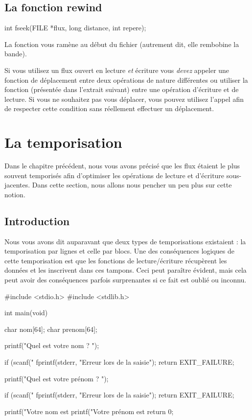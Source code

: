\subsection{La fonction rewind}
\label{la-fonction-rewind}

\begin{C}
int fseek(FILE *flux, long distance, int repere);
\end{C}

La fonction  vous ramène au début du fichier (autrement
dit, elle rembobine la bande).

\begin{erreurbox}
  Si vous utilisez un flux ouvert en lecture
\emph{et} écriture vous \emph{devez} appeler une fonction de déplacement
entre deux opérations de nature différentes ou utiliser la fonction
 (présentée dans l'extrait suivant) entre une opération
d'écriture et de lecture. Si vous ne souhaitez pas vous déplacer, vous
pouvez utilisez l'appel  afin de
respecter cette condition sans réellement effectuer un déplacement.
\end{erreurbox}

\section{La temporisation}
\label{la-temporisation}

Dans le chapitre précédent, nous vous avons précisé que les flux
étaient le plus souvent temporisés afin d'optimiser les opérations de
lecture et d'écriture sous-jacentes. Dans cette section, nous allons
nous pencher un peu plus sur cette notion.

\subsection{Introduction}
\label{introduction-4}

Nous vous avons dit auparavant que deux types de temporisations
existaient : la temporisation par lignes et celle par blocs. Une des
conséquences logiques de cette temporisation est que les fonctions de
lecture/écriture récupèrent les données et les inscrivent dans ces
tampons. Ceci peut paraître évident, mais cela peut avoir des
conséquences parfois surprenantes si ce fait est oublié ou inconnu.

\begin{C}
#include <stdio.h>
#include <stdlib.h>


int main(void)
{
    char nom[64];
    char prenom[64];

    printf("Quel est votre nom ? ");

    if (scanf("%
    {
        fprintf(stderr, "Erreur lors de la saisie\n");
        return EXIT_FAILURE;
    }

    printf("Quel est votre prénom ? ");

    if (scanf("%
    {
        fprintf(stderr, "Erreur lors de la saisie\n");
        return EXIT_FAILURE;
    }

    printf("Votre nom est %
    printf("Votre prénom est %
    return 0;
}
\end{C}


